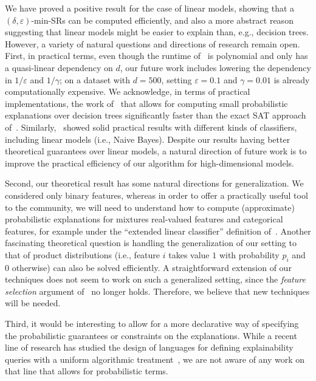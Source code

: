 We have proved a positive result for the case of linear models, showing that a $(\delta, \varepsilon)$-min-SRs can be computed efficiently, and also a more abstract reason suggesting that linear models might be easier to explain than, e.g., decision trees. However,  a variety of natural questions and directions of research remain open. 
First, in practical terms, even though the runtime of~ is polynomial and only has a quasi-linear dependency on $d$, our future work includes lowering the dependency in $1/\varepsilon$ and $1/\gamma$; on a dataset with $d = 500$, setting $\varepsilon = 0.1$ and $\gamma = 0.01$ is already computationally expensive. 
We acknowledge, in terms of practical implementations, the work of~\citet{Louenas,izza2024locallyminimalprobabilisticexplanations} that allows for computing small probabilistic explanations over decision trees significantly faster than the exact SAT approach of~\citet{NEURIPS2022_b8963f6a}.
Similarly,~\citet{izzaComputingProbabilisticAbductive2023} showed solid practical results with different kinds of classifiers, including linear models (i.e., Naive Bayes). Despite our results having better theoretical guarantees over linear models, a natural direction of future work is to improve the practical efficiency of our algorithm for high-dimensional models.

Second, our theoretical result has some natural directions for generalization. We considered only binary features, whereas in order to offer a practically useful tool to the community, we will need to understand how to compute (approximate) probabilistic explanations for mixtures real-valued features and categorical features, for example under the ``extended linear classifier'' definition of~\citet{DBLP:conf/nips/0001GCIN20}.  Another fascinating theoretical question is handling the generalization of our setting to that of product distributions (i.e., feature $i$ takes value $1$ with probability $p_i$ and $0$ otherwise) can also be solved efficiently. A straightforward extension of our techniques does not seem to work on such a generalized setting, since the \emph{feature selection} argument of~ no longer holds. Therefore, we believe that new techniques will be needed.  
 
Third, it would be interesting to allow for a more declarative way of specifying the probabilistic guarantees or constraints on the explanations. While a recent line of research has studied the design of languages for defining explainability queries with a uniform algorithmic treatment~\citep{arenasFoundationsSymbolicLanguages2021,bps2020,KR2024-6}, we are not aware of any work on that line that allows for probabilistic terms.

